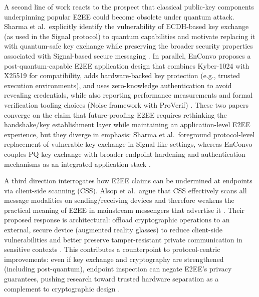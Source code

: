 A second line of work reacts to the prospect that classical public-key components underpinning popular E2EE could become obsolete under quantum attack. Sharma et al.\ explicitly identify the vulnerability of ECDH-based key exchange (as used in the Signal protocol) to quantum capabilities and motivate replacing it with quantum-safe key exchange while preserving the broader security properties associated with Signal-based secure messaging \cite{sharma2023}. In parallel, EnConvo proposes a post-quantum-capable E2EE application design that combines Kyber-1024 with X25519 for compatibility, adds hardware-backed key protection (e.g., trusted execution environments), and uses zero-knowledge authentication to avoid revealing credentials, while also reporting performance measurements and formal verification tooling choices (Noise framework with ProVerif) \cite{r2025}. These two papers converge on the claim that future-proofing E2EE requires rethinking the handshake/key establishment layer while maintaining an application-level E2EE experience, but they diverge in emphasis: Sharma et al.\ foreground protocol-level replacement of vulnerable key exchange in Signal-like settings, whereas EnConvo couples PQ key exchange with broader endpoint hardening and authentication mechanisms as an integrated application stack \cite{sharma2023,r2025}.

A third direction interrogates how E2EE claims can be undermined at endpoints via client-side scanning (CSS). Alsop et al.\ argue that CSS effectively scans all message modalities on sending/receiving devices and therefore weakens the practical meaning of E2EE in mainstream messengers that advertise it \cite{alsop2025}. Their proposed response is architectural: offload cryptographic operations to an external, secure device (augmented reality glasses) to reduce client-side vulnerabilities and better preserve tamper-resistant private communication in sensitive contexts \cite{alsop2025}. This contributes a counterpoint to protocol-centric improvements: even if key exchange and cryptography are strengthened (including post-quantum), endpoint inspection can negate E2EE’s privacy guarantees, pushing research toward trusted hardware separation as a complement to cryptographic design \cite{alsop2025,r2025}.

